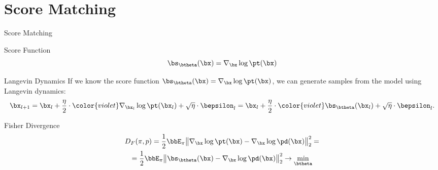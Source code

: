 \documentclass{beamer}
\begin{document}
\section{Score Matching}
\begin{frame}{Score Matching}
	\begin{block}{Score Function}
		\vspace{-0.3cm}
		 \[
			 \bs_{\btheta}(\bx) = \nabla_{\bx}\log \pt(\bx)
		 \]
		\vspace{-0.5cm}
	\end{block}
	\eqpause
	\begin{block}{Langevin Dynamics}
		If we know the score function $\bs_{\btheta}(\bx) = \nabla_{\bx}\log \pt(\bx)$, we can generate samples from the model using Langevin dynamics:
		\[
			\bx_{l + 1} = \bx_l + \frac{\eta}{2} \cdot {\color{violet}\nabla_{\bx_l} \log \pt(\bx_l)} + \sqrt{\eta} \cdot \bepsilon_l = \bx_l + \frac{\eta}{2} \cdot {\color{violet}\bs_{\btheta}(\bx_l)} + \sqrt{\eta} \cdot \bepsilon_l.
		\]
		\vspace{-0.5cm}
	\end{block}
	\eqpause
	\begin{block}{Fisher Divergence}
		\vspace{-0.7cm}
		\begin{multline*}
			D_F(\pi, p) = \frac{1}{2}\bbE_{\pi}\big\| \nabla_{\bx}\log \pt(\bx) - \nabla_\bx \log \pd(\bx) \big\|^2_2 =\\
			= \frac{1}{2}\bbE_{\pi}\big\| \bs_{\btheta}(\bx) - \nabla_\bx \log \pd(\bx) \big\|^2_2 \rightarrow \min_{\btheta}
		\end{multline*}
		\vspace{-0.3cm}
	\end{block}
\end{frame}
\end{document}
